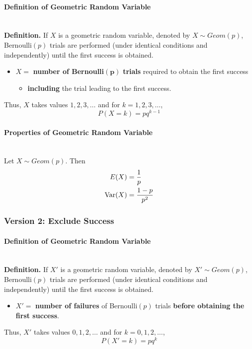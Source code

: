 \documentclass[../st2131_notes.tex]{subfiles}
\begin{document}
\paragraph{Definition of Geometric Random Variable}\,\\
\textbf{Definition.} If \(X\) is a geometric random variable, denoted by \(X\sim Geom(p)\), Bernoulli\((p)\) trials are performed (under identical conditions and independently) until the first success is obtained.
\begin{itemize}
	\item\(X=\) \textbf{number of Bernoulli}\(\bm{(p)}\) \textbf{trials} required to obtain the first success
	\begin{itemize}
		\item\textbf{including} the trial leading to the first success.
	\end{itemize}
\end{itemize}
Thus, \(X\) takes values \(1,2,3,\ldots\) and for \(k=1,2,3,\ldots\),
\[P(X=k)=pq^{k-1}\]

\paragraph{Properties of Geometric Random Variable}\,\\
Let \(X\sim Geom(p)\). Then
\begin{align*}
	E(X)&=\frac{1}{p} \\
	\operatorname{Var}(X)&=\frac{1-p}{p^2}
\end{align*}

\subsubsection{Version 2: Exclude Success}
\paragraph{Definition of Geometric Random Variable}\,\\
\textbf{Definition.} If \(X'\) is a geometric random variable, denoted by \(X'\sim Geom(p)\), Bernoulli\((p)\) trials are performed (under identical conditions and independently) until the first success is obtained.
\begin{itemize}
	\item\(X'=\) \textbf{number of failures} of Bernoulli\((p)\) trials \textbf{before obtaining the first success}.
\end{itemize}
Thus, \(X'\) takes values \(0,1,2,\ldots\) and for \(k=0,1,2,\ldots\),
\[P(X'=k)=pq^k\]
\end{document}
